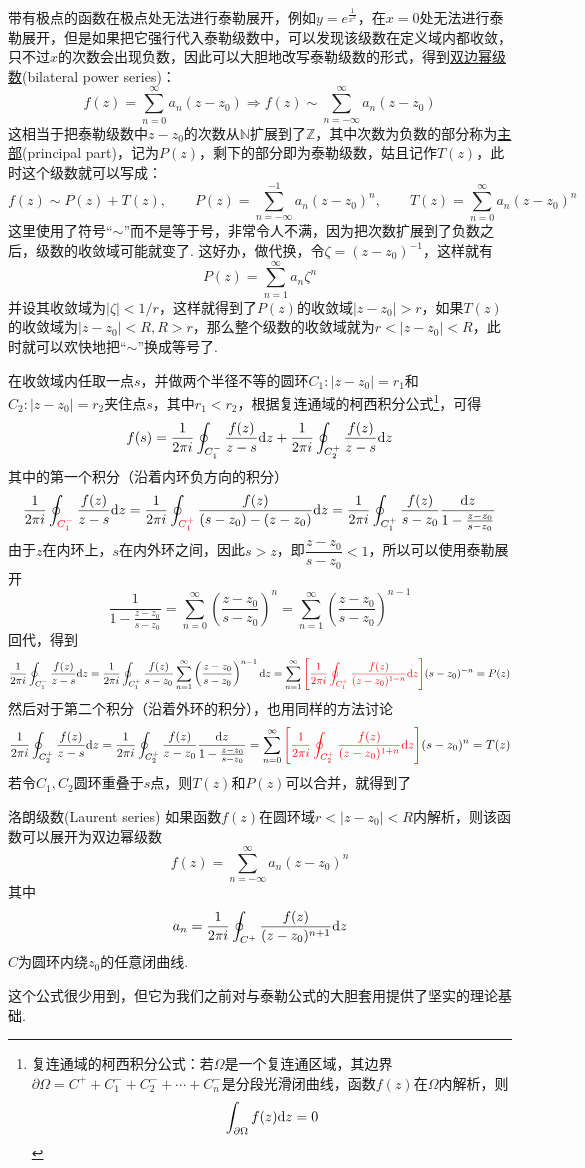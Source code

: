 带有极点的函数在极点处无法进行泰勒展开，例如\(y=e^{\frac{1}{x^2}}\)，在\(x=0\)处无法进行泰勒展开，但是如果把它强行代入泰勒级数中，可以发现该级数在定义域内都收敛，只不过\(x\)的次数会出现负数，因此可以大胆地改写泰勒级数的形式，得到\uline{双边幂级数}(bilateral power series)：
\[f(z)=\sum_{n=0}^{\infty}a_n(z-z_0) \Longrightarrow f(z)\sim\sum_{n=-\infty}^{\infty}a_n(z-z_0)\]
这相当于把泰勒级数中\(z-z_0\)的次数从\(\mathbb{N}\)扩展到了\(\mathbb{Z}\)，其中次数为负数的部分称为\uline{主部}(principal part)，记为\(P(z)\)，剩下的部分即为泰勒级数，姑且记作\(T(z)\)，此时这个级数就可以写成：
\[f(z) \sim P(z)+T(z), \qquad P(z) = \sum_{n=-\infty}^{-1}a_n(z-z_0)^n, \qquad T(z) = \sum_{n=0}^{\infty}a_n(z-z_0)^n\]
这里使用了符号“\(\sim\)”而不是等于号，非常令人不满，因为把次数扩展到了负数之后，级数的收敛域可能就变了. 这好办，做代换，令\(\zeta = (z-z_0)^{-1}\)，这样就有
\[P(z) = \sum_{n=1}^{\infty}a_n\zeta^n\]
并设其收敛域为\(|\zeta|<1/r\)，这样就得到了\(P(z)\)的收敛域\(|z-z_0|>r\)，如果\(T(z)\)的收敛域为\(|z-z_0|<R, R>r\)，那么整个级数的收敛域就为\(r<|z-z_0|<R\)，此时就可以欢快地把“\(\sim\)”换成等号了.

在收敛域内任取一点\(s\)，并做两个半径不等的圆环\(C_1:|z-z_0|=r_1\)和\(C_2:|z-z_0|=r_2\)夹住点\(s\)，其中\(r_1<r_2\)，根据复连通域的柯西积分公式\footnote{复连通域的柯西积分公式：若\(\Omega\)是一个复连通区域，其边界\(\partial \Omega = C^++C_1^-+C_2^-+\cdots+C_n^-\)是分段光滑闭曲线，函数\(f(z)\)在\(\Omega\)内解析，则\[\int_{\partial \Omega}f(z){\rm d}z=0\]}，可得
\[f(s) = \frac{1}{2\pi i}\oint_{C_1^-}\frac{f(z)}{z-s}{\rm d}z + \frac{1}{2\pi i}\oint_{C_2^+}\frac{f(z)}{z-s}{\rm d}z\]
其中的第一个积分（沿着内环负方向的积分）
\[\frac{1}{2\pi i}\oint_{\color{red} C_1^-}\frac{f(z)}{z-s}{\rm d}z = \frac{1}{2\pi i}\oint_{\color{red} C_1^+}\frac{f(z)}{(s-z_0)-(z-z_0)}{\rm d}z = \frac{1}{2\pi i}\oint_{C_1^+}\frac{f(z)}{s-z_0}\frac{{\rm d}z}{1-\frac{z-z_0}{s-z_0}}\]
由于\(z\)在内环上，\(s\)在内外环之间，因此\(s>z\)，即\(\dfrac{z-z_0}{s-z_0}<1\)，所以可以使用泰勒展开
\[\frac{1}{1-\frac{z-z_0}{s-z_0}} = \sum_{n=0}^{\infty}\left(\frac{z-z_0}{s-z_0}\right)^{n} = \sum_{n=1}^{\infty}\left(\frac{z-z_0}{s-z_0}\right)^{n-1}\]
回代，得到
\[\frac{1}{2\pi i}\oint_{C_1^-}\frac{f(z)}{z-s}{\rm d}z = \frac{1}{2\pi i}\oint_{C_1^+}\frac{f(z)}{s-z_0}\sum_{n=1}^{\infty}\left(\frac{z-z_0}{s-z_0}\right)^{n-1}{\rm d}z = \sum_{n=1}^{\infty}{\color{red}\left[\frac{1}{2\pi i}\oint_{C_1^+}\frac{f(z)}{(z-z_0)^{1-n}}{\rm d}z\right]}(s-z_0)^{-n} = P(z)\]
然后对于第二个积分（沿着外环的积分），也用同样的方法讨论
\[\frac{1}{2\pi i}\oint_{C_2^+}\frac{f(z)}{z-s}{\rm d}z = \frac{1}{2\pi i}\oint_{C_2^+}\frac{f(z)}{z-z_0}\frac{{\rm d}z}{1-\frac{z-z_0}{s-z_0}} = \sum_{n=0}^{\infty}{\color{red}\left[\frac{1}{2\pi i}\oint_{C_2^+}\frac{f(z)}{(z-z_0)^{1+n}}{\rm d}z\right]}(s-z_0)^{n} = T(z)\]
若令\(C_1,C_2\)圆环重叠于\(s\)点，则\(T(z)\)和\(P(z)\)可以合并，就得到了
\begin{theorem}{洛朗级数(Laurent series)}
    如果函数\(f(z)\)在圆环域\(r<|z-z_0|<R\)内解析，则该函数可以展开为双边幂级数
    \[f(z) = \sum_{n=-\infty}^{\infty}a_n(z-z_0)^n\]
    其中
    \[a_n=\frac{1}{2\pi i}\oint_{C^+}\frac{f(z)}{(z-z_0)^{n+1}}{\rm d}z\]
    \(C\)为圆环内绕\(z_0\)的任意闭曲线.
\end{theorem}
这个公式很少用到，但它为我们之前对与泰勒公式的大胆套用提供了坚实的理论基础.

